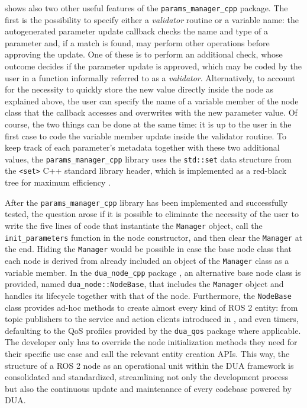  shows also two other useful features of the \texttt{params\_manager\_cpp} package. The first is the possibility to specify either a \emph{validator} routine or a variable name: the autogenerated parameter update callback checks the name and type of a parameter and, if a match is found, may perform other operations before approving the update. One of these is to perform an additional check, whose outcome decides if the parameter update is approved, which may be coded by the user in a function informally referred to as a \emph{validator}. Alternatively, to account for the necessity to quickly store the new value directly inside the node as explained above, the user can specify the name of a variable member of the node class that the callback accesses and overwrites with the new parameter value. Of course, the two things can be done at the same time: it is up to the user in the first case to code the variable member update inside the validator routine. To keep track of each parameter's metadata together with these two additional values, the \texttt{params\_manager\_cpp} library uses the \texttt{std::set} data structure from the \texttt{<set>} C++ standard library header, which is implemented as a red-black tree for maximum efficiency \cite{guibas_dichromatic_1978}.

After the \texttt{params\_manager\_cpp} library has been implemented and successfully tested, the question arose if it is possible to eliminate the necessity of the user to write the five lines of code that instantiate the \texttt{Manager} object, call the \texttt{init\_parameters} function in the node constructor, and then clear the \texttt{Manager} at the end. Hiding the \texttt{Manager} would be possible in case the base \ROS node class that each node is derived from already included an object of the \texttt{Manager} class as a variable member. In the \texttt{dua\_node\_cpp} package \cite{masocco_dua_node_cpp_nodate}, an alternative \ROS base node class is provided, named \texttt{dua\_node::NodeBase}, that includes the \texttt{Manager} object and handles its lifecycle together with that of the node.
Furthermore, the \texttt{NodeBase} class provides ad-hoc methods to create almost every kind of ROS 2 entity: from topic publishers to the service and action clients introduced in , and even timers, defaulting to the QoS profiles provided by the \texttt{dua\_qos} package where applicable. The developer only has to override the node initialization methods they need for their specific use case and call the relevant entity creation APIs. This way, the structure of a ROS 2 node as an operational unit within the DUA framework is consolidated and standardized, streamlining not only the development process but also the continuous update and maintenance of every codebase powered by DUA.

